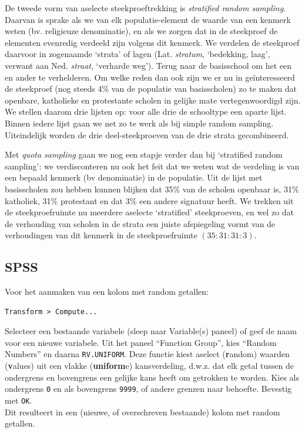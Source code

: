 \documentclass[
]{book}
\begin{document}
De tweede vorm van aselecte steekproeftrekking is
\emph{stratified random sampling}.
Daarvan is sprake als we van elk populatie-element de waarde
van een kenmerk weten (bv. religieuze denominatie), en als we zorgen dat
in de steekproef de elementen evenredig verdeeld zijn volgens dit
kenmerk. We verdelen de steekproef daarvoor in zogenaamde `strata' of
lagen (Lat. \emph{stratum}, `bedekking, laag', verwant aan Ned. \emph{straat},
`verharde weg'). Terug naar de basisschool om het een en ander te
verhelderen. Om welke reden dan ook zijn we er nu in geïnteresseerd de
steekproef (nog steeds 4\% van de populatie van basisscholen) zo te maken
dat openbare, katholieke en protestante scholen in gelijke mate
vertegenwoordigd zijn. We stellen daarom drie lijsten op: voor alle drie
de schooltype een aparte lijst. Binnen iedere lijst gaan we net zo te
werk als bij simple random sampling. Uiteindelijk worden de drie
deel-steekproeven van de drie strata gecombineerd.

Met \emph{quota sampling} gaan we nog een stapje verder dan bij `stratified
random sampling': we verdisconteren nu ook het feit dat we weten wat de
verdeling is van een bepaald kenmerk (bv denominatie) in de populatie.
Uit de lijst met basisscholen zou hebben kunnen blijken dat 35\% van de
scholen openbaar is, 31\% katholiek, 31\% protestant en dat 3\% een andere
signatuur heeft. We trekken uit de steekproefruimte nu meerdere aselecte
`stratified' steekproeven, en wel zo dat de verhouding van scholen in de
strata een juiste afspiegeling vormt van de verhoudingen van dit kenmerk
in de steekproefruimte \((35:31:31:3)\).

\subsection{SPSS}\label{spss}

Voor het aanmaken van een kolom met random getallen:

\begin{verbatim}
Transform > Compute...
\end{verbatim}

Selecteer een bestaande variabele (sleep naar Variable(s) paneel) of geef de naam voor een nieuwe variabele.
Uit het paneel ``Function Group'', kies ``Random Numbers'' en daarna \texttt{RV.UNIFORM}.
Deze functie kiest aselect (\textbf{r}andom) waarden (\textbf{v}alues) uit een vlakke (\textbf{uniform}e) kansverdeling, d.w.z. dat elk getal tussen de ondergrens en bovengrens een gelijke kans heeft om getrokken te worden.
Kies als ondergrens \texttt{0} en als bovengrens \texttt{9999}, of andere grenzen naar behoefte.
Bevestig met \texttt{OK}.\\
Dit resulteert in een (nieuwe, of overschreven bestaande) kolom met random getallen.
\end{document}
